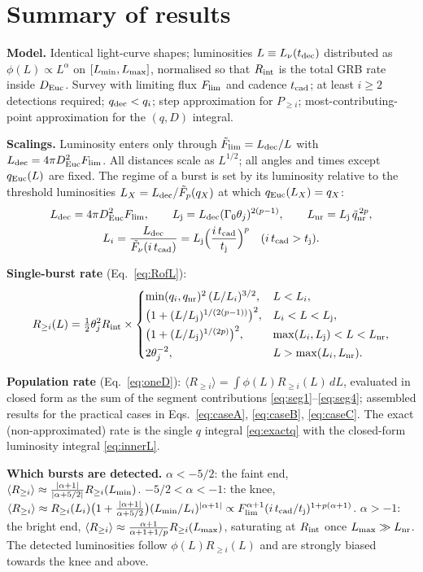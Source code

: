 \documentclass[11pt,a4paper]{article}
\newcommand{\tq}{\tilde{q}}
\newcommand{\tF}{\tilde{F}}
\newcommand{\Euc}{{\rm Euc}}
\newcommand{\dec}{{\rm dec}}
\newcommand{\nr}{{\rm nr}}
\newcommand{\Flim}{F_{\rm lim}}
\newcommand{\tFlim}{\tilde{F}_{\rm lim}}
\newcommand{\Rint}{R_{\rm int}}
\newcommand{\tcad}{t_{\rm cad}}
\newcommand{\tj}{t_{\rm j}}
\newcommand{\Ravg}{\langle R_{\geq i}\rangle}
\newcommand{\Lmin}{L_{\rm min}}
\newcommand{\Lmax}{L_{\rm max}}
\newcommand{\Ldec}{L_{\rm dec}}
\newcommand{\Lj}{L_{\rm j}}
\newcommand{\Lnr}{L_{\rm nr}}
\newcommand{\Lnu}{L_\nu(t_{\rm dec})}
\begin{document}
\section{Summary of results}
\label{sec:summary}

\noindent\textbf{Model.} Identical light-curve shapes; luminosities $L\equiv\Lnu$ distributed as $\phi(L)\propto L^{\alpha}$ on $[\Lmin,\Lmax]$, normalised so that $\Rint$ is the total GRB rate inside $D_\Euc$. Survey with limiting flux $\Flim$ and cadence $\tcad$; at least $i\geq2$ detections required; $q_\dec<q_i$; step approximation for $P_{\geq i}$; most-contributing-point approximation for the $(q,D)$ integral.

\noindent\textbf{Scalings.} Luminosity enters only through $\tFlim=\Ldec/L$ with $\Ldec=4\pi D_\Euc^2\Flim$. All distances scale as $L^{1/2}$; all angles and times except $q_\Euc(L)$ are fixed. The regime of a burst is set by its luminosity relative to the threshold luminosities $L_X=\Ldec/\tF_p(q_X)$ at which $q_\Euc(L_X)=q_X$:
\begin{gather*}
\Ldec=4\pi D_\Euc^2\Flim,\qquad \Lj=\Ldec(\Gamma_0\theta_j)^{2(p-1)},\qquad \Lnr=\Lj\,\tq_\nr^{\,2p},\\
L_i=\frac{\Ldec}{\tF_\nu(i\,\tcad)}=\Lj\Bigl(\frac{i\,\tcad}{\tj}\Bigr)^{p}\quad(i\,\tcad>\tj).
\end{gather*}

\noindent\textbf{Single-burst rate} (Eq.~\eqref{eq:RofL}):
\[
R_{\geq i}(L)=\tfrac12\theta_j^2\Rint\times\begin{cases}\min(q_i,q_\nr)^2\,(L/L_i)^{3/2}, & L<L_i,\\[2pt] \bigl(1+(L/\Lj)^{1/(2(p-1))}\bigr)^2, & L_i<L<\Lj,\\[2pt] \bigl(1+(L/\Lj)^{1/(2p)}\bigr)^2, & \max(L_i,\Lj)<L<\Lnr,\\[2pt] 2\theta_j^{-2}, & L>\max(L_i,\Lnr).\end{cases}
\]

\noindent\textbf{Population rate} (Eq.~\eqref{eq:oneD}): $\Ravg=\int\phi(L)R_{\geq i}(L)\,dL$, evaluated in closed form as the sum of the segment contributions \eqref{eq:seg1}--\eqref{eq:seg4}; assembled results for the practical cases in Eqs.~\eqref{eq:caseA}, \eqref{eq:caseB}, \eqref{eq:caseC}. The exact (non-approximated) rate is the single $q$ integral \eqref{eq:exactq} with the closed-form luminosity integral \eqref{eq:innerL}.

\noindent\textbf{Which bursts are detected.} $\alpha<-5/2$: the faint end, $\Ravg\approx\frac{|\alpha+1|}{|\alpha+5/2|}R_{\geq i}(\Lmin)$. $-5/2<\alpha<-1$: the knee, $\Ravg\approx R_{\geq i}(L_i)\bigl(1+\frac{|\alpha+1|}{\alpha+5/2}\bigr)(\Lmin/L_i)^{|\alpha+1|}\propto\Flim^{\alpha+1}(i\,\tcad/\tj)^{1+p(\alpha+1)}$. $\alpha>-1$: the bright end, $\Ravg\approx\frac{\alpha+1}{\alpha+1+1/p}R_{\geq i}(\Lmax)$, saturating at $\Rint$ once $\Lmax\gg\Lnr$. The detected luminosities follow $\phi(L)R_{\geq i}(L)$ and are strongly biased towards the knee and above.
\end{document}
